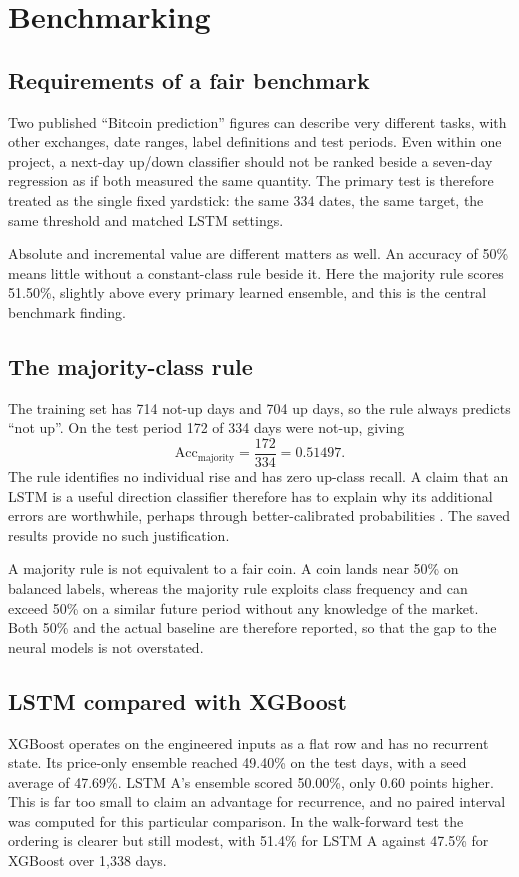 \section{Benchmarking}
\label{ch:benchmark}
\subsection{Requirements of a fair benchmark}
Two published ``Bitcoin prediction'' figures can describe very different tasks, with other exchanges, date ranges, label definitions and test periods. Even within one project, a next-day up/down classifier should not be ranked beside a seven-day regression as if both measured the same quantity. The primary test is therefore treated as the single fixed yardstick: the same 334 dates, the same target, the same threshold and matched LSTM settings.

Absolute and incremental value are different matters as well. An accuracy of 50\% means little without a constant-class rule beside it. Here the majority rule scores 51.50\%, slightly above every primary learned ensemble, and this is the central benchmark finding.

\subsection{The majority-class rule}
The training set has 714 not-up days and 704 up days, so the rule always predicts ``not up''. On the test period 172 of 334 days were not-up, giving
\begin{equation}
\mathrm{Acc}_{\mathrm{majority}}=\frac{172}{334}=0.51497.
\end{equation}
The rule identifies no individual rise and has zero up-class recall. A claim that an LSTM is a useful direction classifier therefore has to explain why its additional errors are worthwhile, perhaps through better-calibrated probabilities \cite{guo2017}. The saved results provide no such justification.

A majority rule is not equivalent to a fair coin. A coin lands near 50\% on balanced labels, whereas the majority rule exploits class frequency and can exceed 50\% on a similar future period without any knowledge of the market. Both 50\% and the actual baseline are therefore reported, so that the gap to the neural models is not overstated.

\subsection{LSTM compared with XGBoost}
XGBoost operates on the engineered inputs as a flat row and has no recurrent state. Its price-only ensemble reached 49.40\% on the test days, with a seed average of 47.69\%. LSTM A's ensemble scored 50.00\%, only 0.60 points higher. This is far too small to claim an advantage for recurrence, and no paired interval was computed for this particular comparison. In the walk-forward test the ordering is clearer but still modest, with 51.4\% for LSTM A against 47.5\% for XGBoost over 1,338 days.

